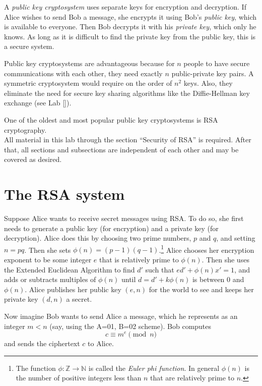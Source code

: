 
A \emph{public key cryptosystem} uses separate keys for encryption and decryption.
If Alice wishes to send Bob a message, she encrypts it using Bob's \emph{public key}, which is available to everyone.
Then Bob decrypts it with his \emph{private key}, which only he knows.
As long as it is difficult to find the private key from the public key, this is a secure system.

Public key cryptosystems are advantageous because for $n$ people to have secure communications with each other, they need exactly $n$ public-private key pairs.
A symmetric cryptosystem would require on the order of $n^2$ keys.
Also, they eliminate the need for secure key sharing algorithms like the Diffie-Hellman key exchange (see Lab \ref{}).

One of the oldest and most popular public key cryptosystems is RSA cryptography.\\

All material in this lab through the section ``Security of RSA'' is required. 
After that, all sections and subsections are independent of each other and may be covered as desired.

\section*{The RSA system}
Suppose Alice wants to receive secret messages using RSA.
To do so, she first needs to generate a public key (for encryption) and a private key (for decryption).
Alice does this by choosing two prime numbers, $p$ and $q$, and setting $n=pq$.
Then she sets $\phi(n) = (p-1)(q-1)$.\footnote{
The function $\phi: \mathbb{Z} \rightarrow \mathbb{N}$ is called the \emph{Euler phi function}. In general $\phi(n)$ is the number of positive integers less than $n$ that are relatively prime to $n$.}
Alice chooses her encryption exponent to be some integer $e$ that is relatively prime to $\phi(n)$.
Then she uses the Extended Euclidean Algorithm to find $d'$ such that $ed' + \phi(n)x' = 1$, and adds or subtracts multiples of $\phi(n)$ until $d = d'+k\phi(n)$ is between 0 and $\phi(n)$.
Alice publishes her public key $(e, n)$ for the world to see and keeps her private key $(d,n)$ a secret.

Now imagine Bob wants to send Alice a message, which he represents as an integer $m<n$ (say, using the A=01, B=02 scheme).
Bob computes 
\[
c \equiv m^e \pmod{n}
\]
and sends the ciphertext $c$ to Alice.

